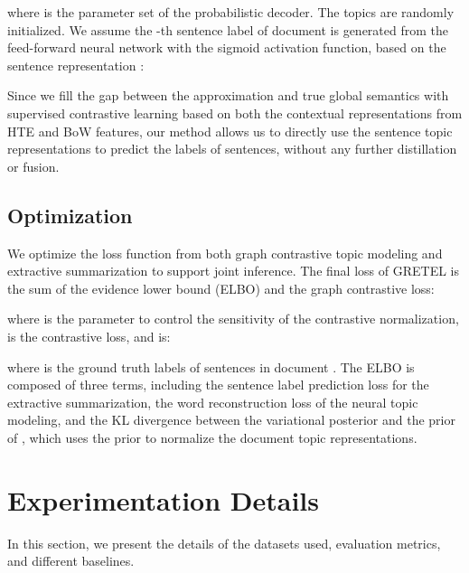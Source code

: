 \documentclass[11pt]{article}
\begin{document}
where  is the parameter set of the probabilistic decoder. The topics  are randomly initialized. We assume the -th sentence label  of document  is generated from the feed-forward neural network  with the sigmoid activation function, based on the sentence representation :

Since we fill the gap between the approximation and true global semantics with supervised contrastive learning based on both the contextual representations from HTE and BoW features,
our method allows us to directly use the sentence topic representations to predict the labels of sentences, without any further distillation or fusion.

\subsection{Optimization}
We optimize the loss function from both graph contrastive topic modeling and extractive summarization to support joint inference.
The final loss of GRETEL is the sum of the evidence lower bound (ELBO) and the graph contrastive loss:

where  is the parameter to control the sensitivity of the contrastive normalization,  is the contrastive loss,
and  is:

where  is the ground truth labels of sentences in document .
The ELBO is composed of three terms, including the sentence label prediction loss for the extractive summarization, the word reconstruction loss of the neural topic modeling,
and the KL divergence between the variational posterior and the prior of , which uses the prior  to normalize the document topic representations. 


\section{Experimentation Details} 
In this section, we present the details of the datasets used, evaluation metrics, and different baselines.
\end{document}
